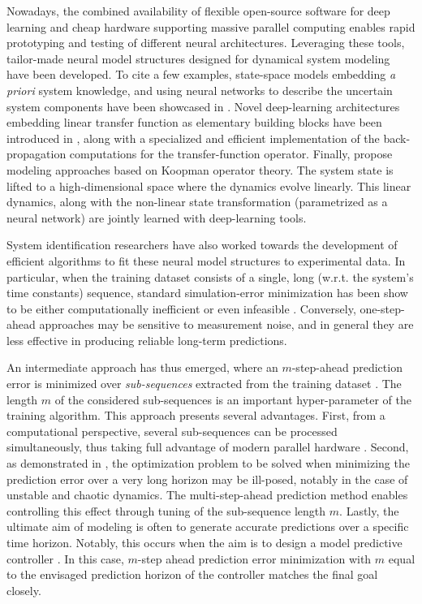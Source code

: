 \documentclass{article}
\newcommand{\seqlen}{m}
\begin{document}
Nowadays, the combined availability of flexible open-source software for deep learning \cite{pytorch} and cheap hardware supporting massive parallel computing enables rapid prototyping and testing of different neural architectures. Leveraging these tools, tailor-made neural model structures designed for dynamical system modeling have been developed. To cite a few examples, state-space models embedding \emph{a priori} system knowledge, and using neural networks to describe the uncertain system components have been showcased in \cite{forgione2020model}. Novel deep-learning architectures embedding linear transfer function as elementary building blocks have been introduced in \cite{forgione2021dynonet}, along with a specialized and efficient implementation of the back-propagation computations for the transfer-function operator. Finally, 
\cite{iacob2021deep, lusch2018deep} propose modeling approaches based on Koopman operator theory. The system state is lifted to a high-dimensional space where the dynamics evolve linearly. This linear dynamics, along with the non-linear state transformation (parametrized as a neural network) 
are jointly learned with deep-learning tools.


System identification researchers have also worked towards the development of efficient algorithms to fit these neural model structures to experimental data. In particular, when the training dataset consists of a single, long (w.r.t. the system's time constants) sequence, standard simulation-error minimization has been show to be either computationally inefficient or even infeasible \cite{forgione2020model, ribeiro2020smoothness}. Conversely, one-step-ahead approaches may be sensitive to measurement noise, and in general they are less effective in producing reliable long-term predictions.

An intermediate approach has thus emerged, where an $\seqlen$-step-ahead prediction error is minimized over \emph{sub-sequences} extracted from the training dataset
\cite{forgione2020model, beintema2021nonlinear, masti2021learning}. 
The length $m$ of the considered sub-sequences is an important hyper-parameter of the training algorithm.
This approach presents several advantages. First, from a computational perspective, several sub-sequences can be processed simultaneously, thus taking full advantage of modern parallel hardware \cite{forgione2020model}. Second, as demonstrated in \cite{ribeiro2020smoothness}, the optimization problem to be solved when minimizing the prediction error over a  very long horizon may be ill-posed, notably in the case of unstable and chaotic dynamics. The multi-step-ahead prediction method enables controlling this effect through tuning of the sub-sequence length $\seqlen$.
Lastly, the ultimate aim of modeling is often to generate accurate predictions over a specific time horizon. Notably, this occurs when the aim is to design a model predictive controller \cite{borrelli2017predictive}. In this case, $m$-step ahead prediction error minimization with $\seqlen$ equal to the envisaged prediction horizon of the controller matches the final goal closely.
\end{document}
